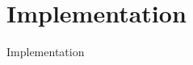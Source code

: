 \documentclass[../main.tex]{subfiles}
\begin{document}
\section{Implementation}
Implementation
\end{document}
